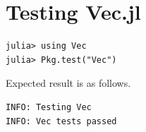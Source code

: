 \documentclass[openany,11pt]{report}%
\begin{document}
\section{Testing Vec.jl}

\begin{lstlisting}[style=DOS]
julia> using Vec
julia> Pkg.test("Vec")
\end{lstlisting}

Expected result is as follows.

\begin{lstlisting}[style=DOS]
INFO: Testing Vec
INFO: Vec tests passed
\end{lstlisting}

\end{document}
